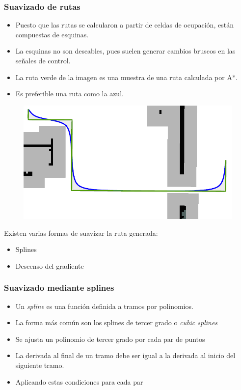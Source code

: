 \documentclass[10pt,spanish,aspectratio=1610]{beamer}
\begin{document}
\begin{frame}\frametitle{Suavizado de rutas}
  \begin{itemize}
  \item Puesto que las rutas se calcularon a partir de celdas de ocupación, están compuestas de esquinas.
  \item La esquinas no son deseables, pues suelen generar cambios bruscos en las señales de control.
  \item La ruta verde de la imagen es una muestra de una ruta calculada por A*.
  \item Es preferible una ruta como la azul. 
  \end{itemize}
  \begin{figure}
    \centering
    \includegraphics[height=0.45\textheight]{Figures/PathSmoothingExample.png}
  \end{figure}
  Existen varias formas de suavizar la ruta generada:
  \begin{itemize}
  \item Splines
  \item Descenso del gradiente
  \end{itemize}
\end{frame}

\begin{frame}\frametitle{Suavizado mediante splines}
  \begin{itemize}
  \item Un \textit{spline} es una función definida a tramos por polinomios.
  \item La forma más común son los splines de tercer grado o \textit{cubic splines}
  \item Se ajusta un polinomio de tercer grado por cada par de puntos
  \item La derivada al final de un tramo debe ser igual a la derivada al inicio del siguiente tramo.
  \item Aplicando estas condiciones para cada par 
  \end{itemize}
  
\end{frame}
\end{document}
